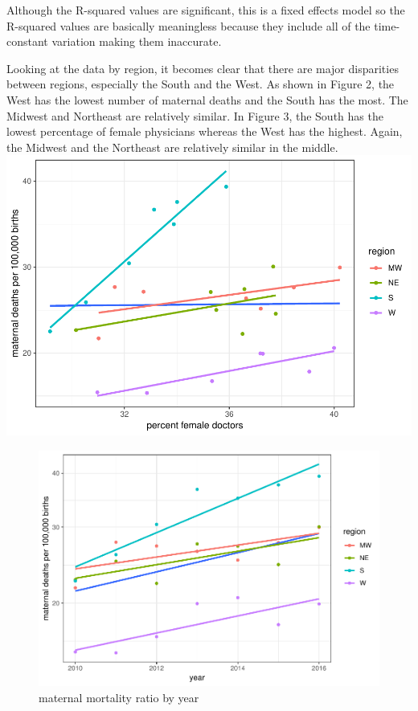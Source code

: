 \documentclass[11pt,]{article}
\makeatletter
\def\maxwidth{\ifdim\Gin@nat@width>\linewidth\linewidth
\else\Gin@nat@width\fi}
\let\Oldincludegraphics\includegraphics
\renewcommand{\includegraphics}[1]{\Oldincludegraphics[width=\maxwidth]{#1}}
\makeatother
\begin{document}
Although the R-squared values are significant, this is a fixed effects
model so the R-squared values are basically meaningless because they
include all of the time-constant variation making them inaccurate.

Looking at the data by region, it becomes clear that there are major
disparities between regions, especially the South and the West. As shown
in Figure 2, the West has the lowest number of maternal deaths and the
South has the most. The Midwest and Northeast are relatively similar. In
Figure 3, the South has the lowest percentage of female physicians
whereas the West has the highest. Again, the Midwest and the Northeast
are relatively similar in the middle.
\includegraphics{main_files/figure-latex/name1-1.pdf}

\begin{figure}
\centering
\includegraphics{main_files/figure-latex/name2-1.pdf}
\caption{maternal mortality ratio by year}
\end{figure}
\end{document}
